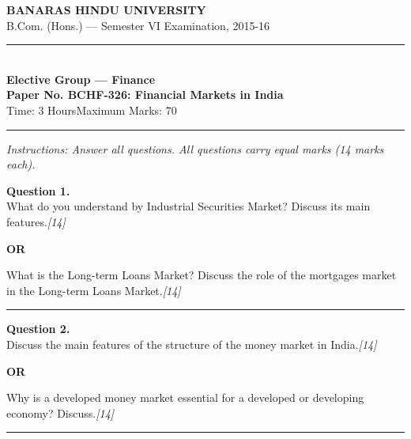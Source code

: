 \documentclass[11pt,a4paper]{article}
\newcommand{\pts}[1]{\hfill   \textit{[#1]}}
\begin{document}
\begin{center}
  {\large\bfseries BANARAS HINDU UNIVERSITY}\\[2pt]
  {\normalsize B.Com. (Hons.) --- Semester VI Examination, 2015-16}\\[6pt]
  \rule{0.8\linewidth}{0.5pt}\\[6pt]
  {\large\bfseries Elective Group --- Finance}\\[4pt]
  {\large\bfseries Paper No. BCHF-326: Financial Markets in India}\\[4pt]
  {\normalsize Time: 3 Hours\hfill Maximum Marks: 70}
\end{center}

\rule{\linewidth}{0.4pt}

\smallskip



\noindent   \textit{Instructions: Answer all questions. All questions carry equal marks (14 marks each).}

\bigskip




\noindent   \textbf{Question 1.} \\
What do you understand by Industrial Securities Market? Discuss its main features.\pts{14}

\centerline{   \textbf{OR}}

What is the Long-term Loans Market? Discuss the role of the mortgages market in the Long-term Loans Market.\pts{14}

\medskip\rule{\linewidth}{0.2pt}




\noindent   \textbf{Question 2.} \\
Discuss the main features of the structure of the money market in India.\pts{14}

\centerline{   \textbf{OR}}

Why is a developed money market essential for a developed or developing economy? Discuss.\pts{14}

\medskip\rule{\linewidth}{0.2pt}

\pagebreak


\begin{center}
\end{center}
\end{document}
